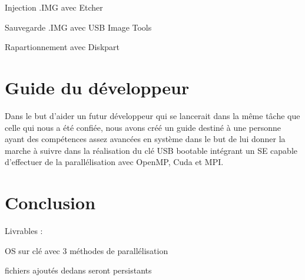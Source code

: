 \documentclass[final]{polytech/polytech}
\begin{document}
Injection .IMG avec Etcher

Sauvegarde .IMG avec USB Image Tools

Rapartionnement avec Diskpart

\part{Guide du développeur} %
Dans le but d'aider un futur développeur qui se lancerait dans la même tâche que celle qui nous a été confiée, nous avons créé un guide destiné à une personne ayant des compétences assez avancées en système dans le but de lui donner la marche à suivre dans la réalisation du clé USB bootable intégrant un SE capable d'effectuer de la parallélisation avec OpenMP, Cuda et MPI.

\part{Conclusion} %
Livrables :

OS sur clé avec 3 méthodes de parallélisation

fichiers ajoutés dedans seront persistants
\end{document}
